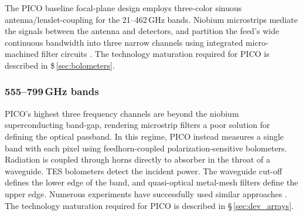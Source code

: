 The PICO baseline focal-plane design
employs three-color sinuous antenna/lenslet-coupling \citep{Suzuki2014}
for the 21--462\,GHz bands. Niobium microstrips mediate the signals
between the antenna and detectors, and partition the feed's wide
continuous bandwidth into three narrow channels using integrated
micro-machined filter circuits \citep{OBrient2013}. The technology
maturation required for PICO is described in \$\,\ref{sec:bolometers}.



\subsubsection{555--799\,GHz bands}
\label{sec:high_freq_det} %

PICO's highest three frequency channels are beyond the niobium
superconducting band-gap, rendering microstrip filters a poor solution
for defining the optical passband. In this regime, PICO instead
measures a single band with each pixel using feedhorn-coupled
polarization-sensitive bolometers. Radiation is coupled through horns
directly to absorber in the throat of a
waveguide. TES bolometers detect the incident power. 
The waveguide cut-off defines the lower edge of the band,
and quasi-optical metal-mesh filters define the upper edge. Numerous
experiments have successfully used similar approaches
\citep{Shirokoff2011,Bleem2012,Turner2001}. The technology maturation
required for PICO is described in \S\,\ref{sec:dev_arrays}.

